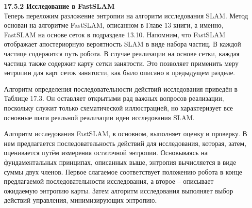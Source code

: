 \documentclass[10pt,a4paper]{article}
\begin{document}
\textbf{17.5.2	Исследование в FastSLAM}\\

Теперь переложим разложение энтропии на алгоритм исследования SLAM. Метод основан на алгоритме FastSLAM, описанном в Главе 13 книги, а именно, FastSLAM на основе сеток в подразделе 13.10. Напомним, что FastSLAM отображает апостериорную вероятность SLAM в виде набора частиц. В каждой частице содержится путь робота. В случае реализации на основе сетки, каждая частица также содержит карту сетки занятости. Это позволяет применить меру энтропии для карт сеток занятости, как было описано в предыдущем разделе.

Алгоритм определения последовательности действий исследования приведён в Таблице 17.3. Он оставляет открытыми рад важных вопросов реализации, поскольку служит только схематической иллюстрацией, но характеризует все основные шаги реальной реализации идеи исследования SLAM.

Алгоритм исследования FastSLAM, в основном, выполняет оценку и проверку. В нем предлагается последовательность действий для исследования, которая, затем, оценивается путём измерения остаточной энтропии. Основываясь на фундаментальных принципах, описанных выше, энтропия вычисляется в виде суммы двух членов. Первое слагаемое соответствует положению робота в конце предлагаемой последовательности исследования, а второе – описывает ожидаемую энтропию карты. Затем алгоритм исследования выполняет выбор действий управления, минимизирующих энтропию.
\end{document}
